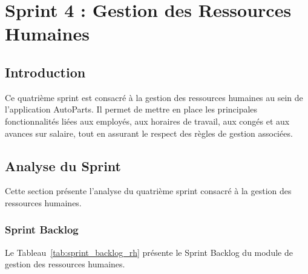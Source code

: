 \chapter{Sprint 4 : Gestion des Ressources Humaines}
\localtableofcontents
\newpage
\section{Introduction}

Ce quatrième sprint est consacré à la gestion des ressources humaines au sein de l'application AutoParts. Il permet de mettre en place les principales fonctionnalités liées aux employés, aux horaires de travail, aux congés et aux avances sur salaire, tout en assurant le respect des règles de gestion associées.



\section{Analyse du Sprint}

Cette section présente l'analyse du quatrième sprint consacré à la gestion des ressources humaines.




\subsection*{Sprint Backlog}

Le Tableau~\ref{tab:sprint_backlog_rh} présente le Sprint Backlog du module de gestion des ressources humaines.

